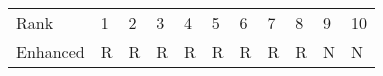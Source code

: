 \begin{tabular}{lllllllllll}
Rank & 1 & 2 & 3 & 4 & 5 & 6 & 7 & 8 & 9 & 10 \\
Enhanced & R & R & R & R & R & R & R & R & N & N \\
\end{tabular}
